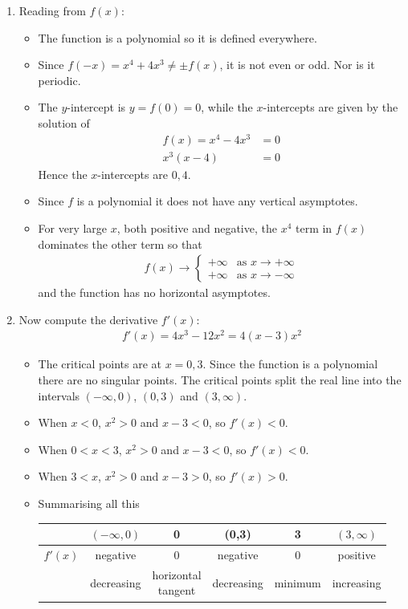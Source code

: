 \begin{eg}[Sketch $f(x)=x^4-4x^3$]\label{APPsketchB}
\begin{enumerate}[(1)]
\item Reading from $f(x)$:
\begin{itemize}
 \item The function is a polynomial so it is defined everywhere.
\item Since $f(-x) = x^4+4x^3 \neq \pm f(x)$, it is not even or odd. Nor is it periodic.
\item The $y$-intercept is $y=f(0)=0$, while the $x$-intercepts are given by the solution
of
\begin{align*}
  f(x)=x^4-4x^3 &= 0\\
  x^3(x-4)&=0
\end{align*}
Hence the $x$-intercepts are $0,4$.

\item Since $f$ is a polynomial it does not have any vertical asymptotes.
\item For very large $x$, both positive and negative, the $x^4$ term in $f(x)$ dominates
the other term so that
\begin{align*}
f(x)\rightarrow\begin{cases}+\infty &\text{as }x\rightarrow+\infty \\
                            +\infty &\text{as }x\rightarrow-\infty
                \end{cases}
\end{align*}
and the function has no horizontal asymptotes.
\end{itemize}

\item Now compute the derivative $f'(x)$:
\begin{align*}
f'(x) = 4x^3-12x^2 = 4(x-3)x^2
\end{align*}
\begin{itemize}
 \item The critical points are at $x=0,3$. Since the function is a polynomial there are
no singular points. The critical points split the real line into the intervals
$(-\infty,0)$, $(0,3)$ and $(3,\infty)$.
\item When $x<0$, $x^2>0$ and $x-3<0$, so $f'(x) < 0$.
\item When $0<x<3$, $x^2>0$ and $x-3<0$, so $f'(x) < 0$.
\item When $3<x$, $x^2>0$ and $x-3>0$, so $f'(x) > 0$.
\item Summarising all this
\begin{center}
 \begin{tabular}{|c|c||c||c||c||c|}
\hline
  & $(-\infty,0)$ & 0 & (0,3) & 3 & $(3,\infty)$\\
\hline
$f'(x)$  & negative & 0 & negative & 0 & positive \\
\hline
 & decreasing & \parbox{2cm}{\centering horizontal \newline tangent} & decreasing &
minimum & increasing \\
\hline
 \end{tabular}
\end{center}


\end{itemize}
\end{enumerate}
\end{eg}
